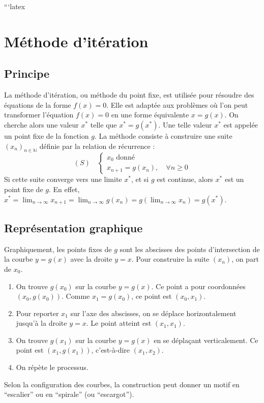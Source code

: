 ```latex

\sloppy

\section{Méthode d'itération}
\label{sec:methode_iteration}

\subsection{Principe}
\label{ssec:iteration_principe}
La méthode d'itération, ou méthode du point fixe, est utilisée pour résoudre des équations de la forme $f(x) = 0$.
Elle est adaptée aux problèmes où l'on peut transformer l'équation $f(x)=0$ en une forme équivalente $x = g(x)$.
On cherche alors une valeur $x^*$ telle que $x^* = g(x^*)$. Une telle valeur $x^*$ est appelée un point fixe de la fonction $g$.
La méthode consiste à construire une suite $(x_n)_{n \in \mathbb{N}}$ définie par la relation de récurrence :
\begin{equation}
(S) \quad
\begin{cases}
x_0 \text{ donné} \\
x_{n+1} = g(x_n), \quad \forall n \ge 0
\end{cases}
\end{equation}
Si cette suite converge vers une limite $x^*$, et si $g$ est continue, alors $x^*$ est un point fixe de $g$. En effet,
$x^* = \lim_{n \to \infty} x_{n+1} = \lim_{n \to \infty} g(x_n) = g(\lim_{n \to \infty} x_n) = g(x^*)$.

\subsection{Représentation graphique}
\label{ssec:iteration_representation_graphique}
Graphiquement, les points fixes de $g$ sont les abscisses des points d'intersection de la courbe $y=g(x)$ avec la droite $y=x$.
Pour construire la suite $(x_n)$, on part de $x_0$.
\begin{enumerate}
    \item On trouve $g(x_0)$ sur la courbe $y=g(x)$. Ce point a pour coordonnées $(x_0, g(x_0))$. Comme $x_1 = g(x_0)$, ce point est $(x_0, x_1)$.
    \item Pour reporter $x_1$ sur l'axe des abscisses, on se déplace horizontalement jusqu'à la droite $y=x$. Le point atteint est $(x_1, x_1)$.
    \item On trouve $g(x_1)$ sur la courbe $y=g(x)$ en se déplaçant verticalement. Ce point est $(x_1, g(x_1))$, c'est-à-dire $(x_1, x_2)$.
    \item On répète le processus.
\end{enumerate}
Selon la configuration des courbes, la construction peut donner un motif en ``escalier'' ou en ``spirale'' (ou ``escargot'').

